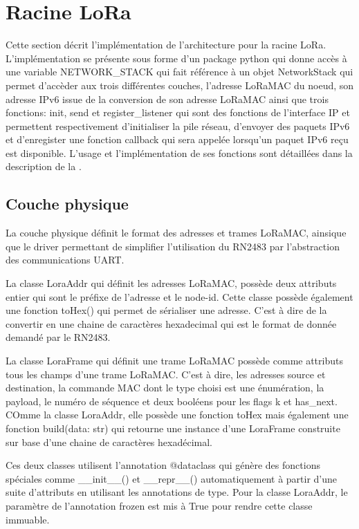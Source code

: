 \section{Racine LoRa}\label{sec:work-lora-root}
\renewcommand{\rightmark}{Trames LoRaMac}

    Cette section décrit l'implémentation de l'architecture pour la racine LoRa.
    L'implémentation se présente sous forme d'un package python qui donne accès à une variable NETWORK\_STACK qui fait référence à un objet NetworkStack qui permet d'accèder aux trois différentes couches, l'adresse LoRaMAC du noeud, son adresse IPv6 issue de la conversion de son adresse LoRaMAC ainsi que trois fonctions: init, send et register\_listener qui sont des fonctions de l'interface IP et permettent respectivement d'initialiser la pile réseau, d'envoyer des paquets IPv6 et d'enregister une fonction callback qui sera appelée lorsqu'un paquet IPv6 reçu est disponible. L'usage et l'implémentation de ses fonctions sont détaillées dans la description de la .

\subsection*{Couche physique}
    La couche physique définit le format des adresses et trames LoRaMAC, ainsique que le driver 
    permettant de simplifier l'utilisation du RN2483 par l'abstraction des communications UART.

    La classe LoraAddr qui définit les adresses LoRaMAC, possède deux attributs entier qui sont le préfixe de l'adresse et le node-id. Cette classe possède également une fonction toHex() qui permet de sérialiser une adresse. C'est à dire de la convertir en une chaine de caractères hexadecimal qui est le format de donnée demandé par le RN2483.

    La classe LoraFrame qui définit une trame LoRaMAC possède comme attributs tous les champs d'une trame LoRaMAC. C'est à dire, les adresses source et destination, la commande MAC dont le type choisi est une énumération, la payload, le numéro de séquence et deux booléens pour les flags k et has\_next. COmme la classe LoraAddr, elle possède une fonction toHex mais également une fonction build(data: str) qui retourne une instance d'une LoraFrame construite sur base d'une chaine de caractères hexadécimal.

    Ces deux classes utilisent l'annotation @dataclass qui génère des fonctions spéciales comme \_\_init\_\_() et \_\_repr\_\_() automatiquement à partir d'une suite d'attributs en utilisant les annotations de type. Pour la classe LoraAddr, le paramètre de l'annotation frozen est mis à True pour rendre cette classe immuable.

